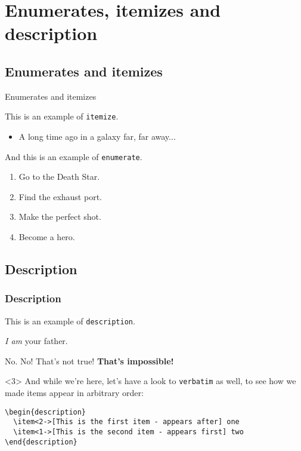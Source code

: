 \documentclass[usenames,dvipsnames,10pt]{beamer}
\begin{document}
\section{Enumerates, itemizes and description}

\subsection{Enumerates and itemizes}


\begin{frame}{Enumerates and itemizes}

This is an example of \texttt{itemize}.
\begin{itemize}
	\item A long time ago in a galaxy far, far away...
\end{itemize}
And this is an example of \texttt{enumerate}.

\begin{enumerate} 
  \item Go to the Death Star.
  \item Find the exhaust port.
  \item Make the perfect shot.
  \item Become a hero.
\end{enumerate}
\end{frame}

\subsection{Description}

\begin{frame}[fragile]
\frametitle{Description}
This is an example of \texttt{description}.

\begin{description}
\item<2->[Vader] \emph{I am} your father.
\item<1->[Luke] No. No! That's not true! \textbf{That's impossible!}
\end{description}

\begin{uncoverenv}<3>
  \vskip 0.5cm
  And while we're here, let's have a look to \texttt{verbatim} as well, to see how we made items appear in arbitrary order:
  \vskip 0.5cm
  \begin{verbatim}
\begin{description}
  \item<2->[This is the first item - appears after] one
  \item<1->[This is the second item - appears first] two
\end{description}
  \end{verbatim}
\end{uncoverenv}

\end{frame}
\end{document}
